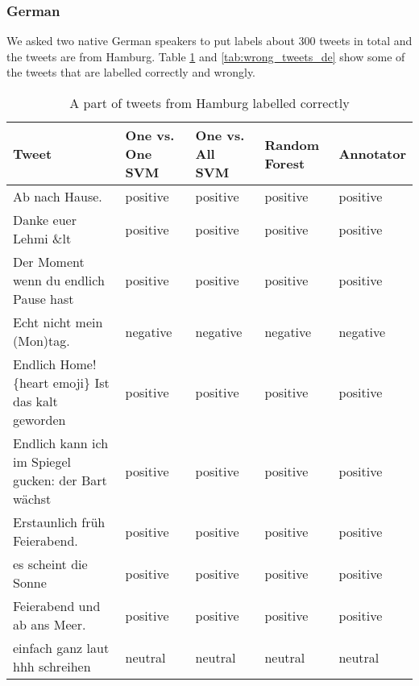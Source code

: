 \subsubsection{German}
We asked two native German speakers to put labels about 300 tweets in total and the tweets are from Hamburg.
Table \ref{tab:correct_tweets_de} and \ref{tab:wrong_tweets_de}  show some of the tweets that are labelled correctly and wrongly.
\begin{table}[ht]
	\caption{A part of tweets from Hamburg labelled correctly}
	\begin{tabular}{|p{5cm}|p{1.8cm}|p{1.8cm}|p{1.8cm}|p{1.8cm}|} \hline
	Tweet & One vs. One SVM &One vs. All SVM &Random Forest & Annotator\\ \hline

	Ab nach Hause. &positive&positive&positive&positive\\ \hline
	Danke euer Lehmi \&lt&positive&positive&positive&positive\\ \hline
	Der Moment wenn du endlich Pause hast &positive&positive&positive&positive\\ \hline
	Echt nicht mein (Mon)tag. &negative&negative&negative&negative\\ \hline
	Endlich Home! \{heart emoji\} Ist das kalt geworden &positive&positive&positive&positive\\ \hline

	Endlich kann ich im Spiegel gucken: der Bart w\"achst &positive&positive&positive&positive\\ \hline
	Erstaunlich fr\"uh Feierabend. &positive&positive&positive&positive\\ \hline
	es scheint die Sonne &positive&positive&positive&positive\\ \hline
	Feierabend und ab ans Meer. &positive&positive&positive&positive\\ \hline
	einfach ganz laut hhh schreihen&neutral &neutral&neutral&neutral\\ \hline

	
	
	\end{tabular}
	\label{tab:correct_tweets_de}
\end{table}


